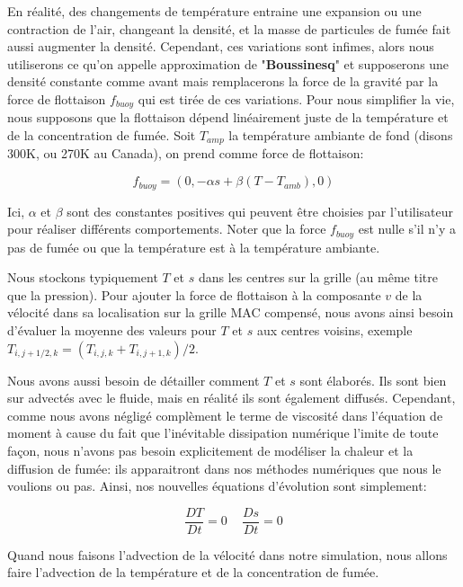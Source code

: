 \documentclass[11pt]{report}
\begin{document}
En réalité, des changements de température entraine une expansion ou une contraction de l'air, changeant la densité, et la masse de particules de fumée fait aussi augmenter la densité. Cependant, ces variations sont infimes, alors nous utiliserons ce qu'on appelle approximation de "\textbf{Boussinesq}" et supposerons une densité constante comme avant mais remplacerons la force de la gravité par la force de flottaison \textit{$f_{buoy}$} qui est tirée de ces variations. Pour nous simplifier la vie, nous supposons que la flottaison dépend linéairement juste de la température et de la concentration de fumée. Soit $T_{amp}$ la température ambiante de fond (disons 300K, ou 270K au Canada), on prend comme force de flottaison:

\begin{equation}
f_{buoy} = (0, -\alpha s + \beta (T-T_{amb}) ,0)
\end{equation}

Ici, $\alpha$ et $\beta$ sont des constantes positives qui peuvent être choisies par l'utilisateur pour réaliser différents comportements. Noter que la force $f_{buoy}$ est nulle s'il n'y a pas de fumée ou que la température est à la température ambiante.\newline

Nous stockons typiquement $T$ et $s$ dans les centres sur la grille (au même titre que la pression). Pour ajouter la force de flottaison à la composante $v$ de la vélocité dans sa localisation sur la grille MAC compensé, nous avons ainsi besoin d'évaluer la moyenne des valeurs pour $T$ et $s$ aux centres voisins, exemple $T_{i, j+1/2, k} = (T_{i,j,k} + T_{i,j+1,k})/2$.\newline

Nous avons aussi besoin de détailler comment $T$ et $s$ sont élaborés. Ils sont bien sur advectés avec le fluide, mais en réalité ils sont également diffusés. Cependant, comme nous avons négligé complèment le terme de viscosité dans l'équation de moment à cause du fait que l'inévitable dissipation numérique l'imite de toute façon, nous n'avons pas besoin explicitement de modéliser la chaleur et la diffusion de fumée: ils apparaitront dans nos méthodes numériques que nous le voulions ou pas. Ainsi, nos nouvelles équations d'évolution sont simplement:

\begin{equation}
\frac{DT}{Dt} = 0 \,\,\,\,\,\,\, \frac{Ds}{Dt} = 0
\end{equation}

Quand nous faisons l'advection de la vélocité dans notre simulation, nous allons faire l'advection de la température et de la concentration de fumée.
\end{document}
